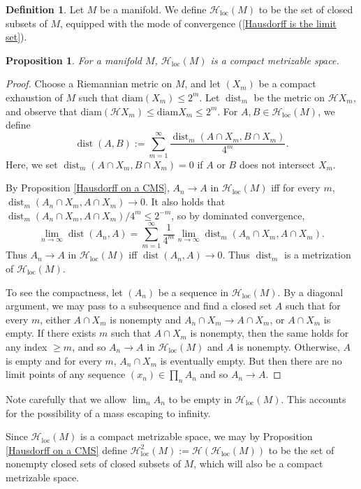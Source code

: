 \documentclass[reqno,11pt]{amsart}
\DeclareMathOperator{\dist}{dist}
\newcommand{\Hypspace}{\mathscr H}
\newcommand{\diam}{\mathrm{diam}}
\newcommand{\loc}{\mathrm{loc}}
\newtheorem{proposition}[theorem]{Proposition}
\theoremstyle{definition}
\newtheorem{definition}[theorem]{Definition}
\numberwithin{equation}{section}
\begin{document}
\begin{definition}
Let $M$ be a manifold. We define $\Hypspace_\loc(M)$ to be the set of closed subsets of $M$, equipped with the mode of convergence (\ref{Hausdorff is the limit set}).
\end{definition}

\begin{proposition}
For a manifold $M$, $\Hypspace_\loc(M)$ is a compact metrizable space.
\end{proposition}
\begin{proof}
Choose a Riemannian metric on $M$, and let $(X_m)$ be a compact exhaustion of $M$ such that $\diam(X_m) \leq 2^m$.
Let $\dist_m$ be the metric on $\Hypspace X_m$, and observe that $\diam(\Hypspace X_m) \leq \diam X_m \leq 2^m$.
For $A, B \in \Hypspace_\loc(M)$, we define
$$\dist(A, B) := \sum_{m=1}^\infty \frac{\dist_m(A \cap X_m, B \cap X_m)}{4^m}.$$
Here, we set $\dist_m(A \cap X_m, B \cap X_m) = 0$ if $A$ or $B$ does not intersect $X_m$.

By Proposition \ref{Hausdorff on a CMS}, $A_n \to A$ in $\Hypspace_\loc(M)$ iff for every $m$, $\dist_m(A_n \cap X_m, A \cap X_m) \to 0$.
It also holds that $\dist_m(A_n \cap X_m, A \cap X_m)/4^m \leq 2^{-m}$, so by dominated convergence,
$$\lim_{n \to \infty} \dist(A_n, A) = \sum_{m=1}^\infty \frac{1}{4^m} \lim_{n \to \infty} \dist_m(A_n \cap X_m, A \cap X_m).$$
Thus $A_n \to A$ in $\Hypspace_\loc(M)$ iff $\dist(A_n, A) \to 0$.
Thus $\dist_m$ is a metrization of $\Hypspace_\loc(M)$.

To see the compactness, let $(A_n)$ be a sequence in $\Hypspace_\loc(M)$.
By a diagonal argument, we may pass to a subsequence and find a closed set $A$ such that for every $m$, either $A \cap X_m$ is nonempty and $A_n \cap X_m \to A \cap X_m$, or $A \cap X_m$ is empty.
If there exists $m$ such that $A \cap X_m$ is nonempty, then the same holds for any index $\geq m$, and so $A_n \to A$ in $\Hypspace_\loc(M)$ and $A$ is nonempty.
Otherwise, $A$ is empty and for every $m$, $A_n \cap X_m$ is eventually empty.
But then there are no limit points of any sequence $(x_n) \in \prod_n A_n$ and so $A_n \to A$.
\end{proof}

Note carefully that we allow $\lim_n A_n$ to be empty in $\Hypspace_\loc(M)$. This accounts for the possibility of a mass escaping to infinity.

Since $\Hypspace_\loc(M)$ is a compact metrizable space, we may by Proposition \ref{Hausdorff on a CMS} define $\Hypspace^2_\loc(M) := \Hypspace(\Hypspace_\loc(M))$ to be the set of nonempty closed sets of closed subsets of $M$, which will also be a compact metrizable space.
\end{document}
